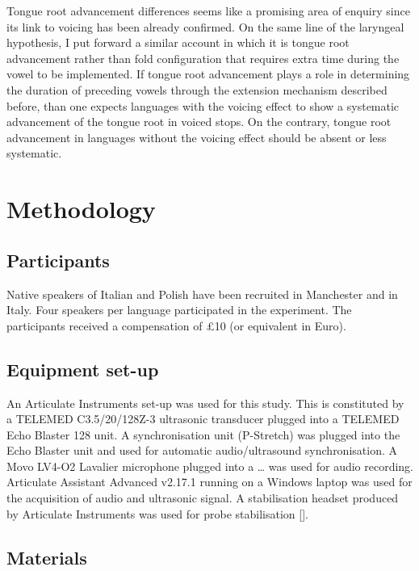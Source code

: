 \documentclass[]{elsarticle}
\begin{document}
Tongue root advancement differences seems like a promising area of
enquiry since its link to voicing has been already confirmed. On the
same line of the laryngeal hypothesis, I put forward a similar account
in which it is tongue root advancement rather than fold configuration
that requires extra time during the vowel to be implemented. If tongue
root advancement plays a role in determining the duration of preceding
vowels through the extension mechanism described before, than one
expects languages with the voicing effect to show a systematic
advancement of the tongue root in voiced stops. On the contrary, tongue
root advancement in languages without the voicing effect should be
absent or less systematic.

\section{Methodology}\label{methodology}

\subsection{Participants}\label{participants}

Native speakers of Italian and Polish have been recruited in Manchester
and in Italy. Four speakers per language participated in the experiment.
The participants received a compensation of £10 (or equivalent in Euro).

\subsection{Equipment set-up}\label{equipment-set-up}

An Articulate Instruments set-up was used for this study. This is
constituted by a TELEMED C3.5/20/128Z-3 ultrasonic transducer plugged
into a TELEMED Echo Blaster 128 unit. A synchronisation unit (P-Stretch)
was plugged into the Echo Blaster unit and used for automatic
audio/ultrasound synchronisation. A Movo LV4-O2 Lavalier microphone
plugged into a \ldots{} was used for audio recording. Articulate
Assistant Advanced v2.17.1 running on a Windows laptop was used for the
acquisition of audio and ultrasonic signal. A stabilisation headset
produced by Articulate Instruments was used for probe stabilisation
{[}{]}.

\subsection{Materials}\label{materials}
\end{document}

